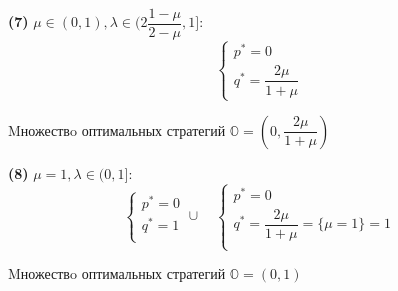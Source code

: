 \begin{flushleft}
\hspace{5mm}

\textbf{(7)}
$\mu \in (0, 1), \lambda \in (2\dfrac{1 - \mu}{2 - \mu}, 1]$: 
$$
	\begin{cases}
		p^* = 0 \\
		q^* = \dfrac{2\mu}{1 + \mu}
	\end{cases}
$$

Mножествo оптимальных стратегий 
$\mathbb{O}  = (0, \dfrac{2\mu}{1 + \mu})$

\hspace{5mm}

\textbf{(8)}
$\mu = 1, \lambda \in (0, 1] $: 
$$
	\begin{cases}
		p^* = 0 \\
		q^* = 1 \\
	\end{cases}  \cup \quad
	\begin{cases}
		p^* = 0 \\
		q^* = \dfrac{2\mu}{1 + \mu} = \{\mu = 1\} = 1 \\
	\end{cases}
$$

Mножествo оптимальных стратегий 
$\mathbb{O} =(0, 1)$ 
\end{flushleft}
